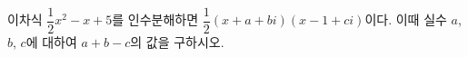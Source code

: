 이차식 $\dfrac{1}{2}x^2-x+5$를 인수분해하면 $\dfrac{1}{2}(x+a+bi)(x-1+ci)$이다. 이때 실수 $a$, $b$, $c$에 대하여 $a+b-c$의 값을 구하시오. 
